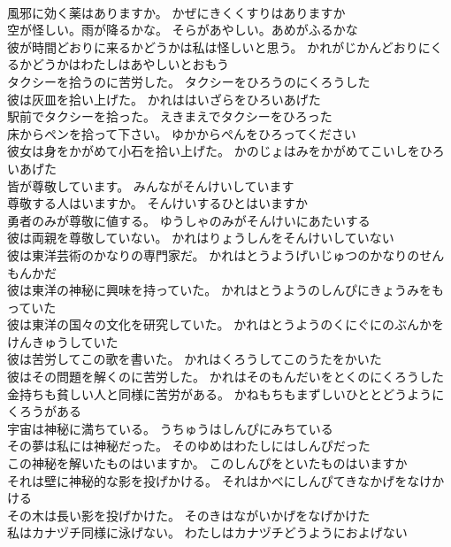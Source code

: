 \documentclass[8pt]{extreport}
\begin{document}
\begin{CJK}{UTF8}{min}
\\	風邪に効く薬はありますか。	かぜにきくくすりはありますか 
\\	空が怪しい。雨が降るかな。	そらがあやしい。あめがふるかな 
\\	彼が時間どおりに来るかどうかは私は怪しいと思う。	かれがじかんどおりにくるかどうかはわたしはあやしいとおもう 
\\	タクシーを拾うのに苦労した。	タクシーをひろうのにくろうした 
\\	彼は灰皿を拾い上げた。	かれははいざらをひろいあげた 
\\	駅前でタクシーを拾った。	えきまえでタクシーをひろった 
\\	床からペンを拾って下さい。	ゆかからぺんをひろってください 
\\	彼女は身をかがめて小石を拾い上げた。	かのじょはみをかがめてこいしをひろいあげた 
\\	皆が尊敬しています。	みんながそんけいしています 
\\	尊敬する人はいますか。	そんけいするひとはいますか 
\\	勇者のみが尊敬に値する。	ゆうしゃのみがそんけいにあたいする 
\\	彼は両親を尊敬していない。	かれはりょうしんをそんけいしていない 
\\	彼は東洋芸術のかなりの専門家だ。	かれはとうようげいじゅつのかなりのせんもんかだ 
\\	彼は東洋の神秘に興味を持っていた。	かれはとうようのしんぴにきょうみをもっていた 
\\	彼は東洋の国々の文化を研究していた。	かれはとうようのくにぐにのぶんかをけんきゅうしていた 
\\	彼は苦労してこの歌を書いた。	かれはくろうしてこのうたをかいた 
\\	彼はその問題を解くのに苦労した。	かれはそのもんだいをとくのにくろうした 
\\	金持ちも貧しい人と同様に苦労がある。	かねもちもまずしいひととどうようにくろうがある 
\\	宇宙は神秘に満ちている。	うちゅうはしんぴにみちている 
\\	その夢は私には神秘だった。	そのゆめはわたしにはしんぴだった 
\\	この神秘を解いたものはいますか。	このしんぴをといたものはいますか 
\\	それは壁に神秘的な影を投げかける。	それはかべにしんぴてきなかげをなけかける 
\\	その木は長い影を投げかけた。	そのきはながいかげをなげかけた 
\\	私はカナヅチ同様に泳げない。	わたしはカナヅチどうようにおよげない 

\end{CJK}
\end{document}
